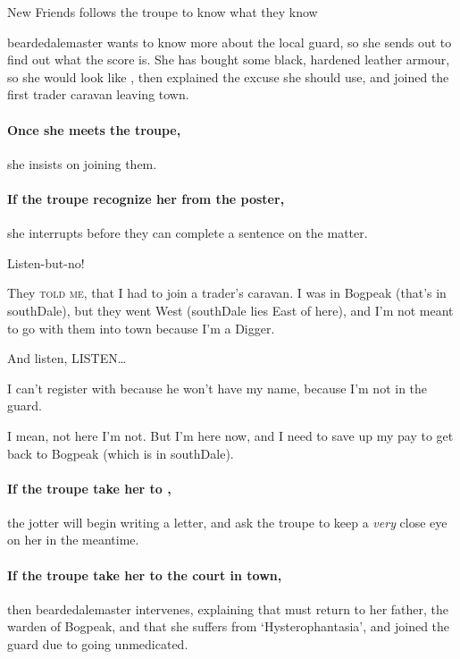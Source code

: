 {New Friends}%
{ follows the troupe to know what they know}%

\Gls{beardedalemaster} wants to know more about the local \gls{guard}, so she sends  out to find out what the score is.
She has bought  some black, hardened leather armour, so she would look like , then explained the excuse she should use, and  joined the first trader caravan leaving \gls{town}.

\paragraph{Once she meets the troupe,}
she insists on joining them.

\paragraph{If the troupe recognize her from the poster,}
she interrupts before they can complete a sentence on the matter.

\begin{speechtext}
  Listen-but-no!
  
  They {\scshape told me}, that I had to join a trader's caravan.
  I was in Bogpeak (that's in \gls{southDale}), but they went West (\gls{southDale} lies East of here), and I'm not meant to go with them into \gls{town} because I'm a Digger.
  
  And listen, LISTEN\ldots

  I can't register with  because he won't have my name, because I'm not in the \gls{guard}.

  I mean, not here I'm not.
  But I'm here now, and I need to save up my pay to get back to Bogpeak (which is in \gls{southDale}).
\end{speechtext}

\paragraph{If the troupe take her to ,}
the \gls{jotter} will begin writing a letter, and ask the troupe to keep a \textit{very} close eye on her in the meantime.

\paragraph{If the troupe take her to the \gls{court} in \gls{town},}
then \gls{beardedalemaster} intervenes, explaining that  must return to her father, the \gls{warden} of Bogpeak, and that she suffers from `Hysterophantasia', and joined the \gls{guard} due to going unmedicated.

